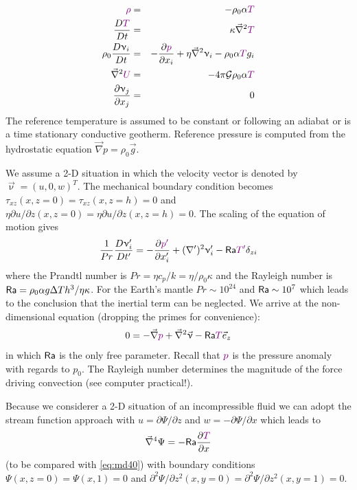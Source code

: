 \begin{eqnarray}
{\color{violet} \rho} &=& -\rho_0 \alpha {\color{violet}T} \\
\frac{D {\color{violet}T}}{Dt} &=& \kappa \vec\nabla^2 {\color{violet}T} \\
\rho_0 \frac{D\upnu_i}{Dt} &=& -\frac{\partial {\color{violet} p}}{\partial x_i}
+ \eta \vec\nabla^2 \upnu_i - \rho_0 \alpha {\color{violet}T} g_i \\
\vec\nabla^2 {\color{violet}U} &=& -4 \pi {\cal G} \rho_0 \alpha {\color{violet}T} \\
\frac{\partial \upnu_j}{\partial x_j} &=& 0
\end{eqnarray}
The reference temperature is assumed to be constant or following an adiabat or is a time
stationary conductive geotherm. Reference pressure is computed from the hydrostatic
equation $\vec\nabla p = \rho_0 \vec{g}$.

We assume a 2-D situation in which the velocity vector is denoted by
$\vec\upnu=(u,0,w)^T$. The mechanical boundary condition becomes
$\tau_{xz}(x,z=0)=\tau_{xz}(x,z=h)=0$ and 
$\eta \partial u/\partial z (x,z=0) = \eta \partial u/\partial z (x,z=h) = 0$.
The scaling of the equation of motion gives
\begin{equation}
\frac{1}{Pr} \frac{D\upnu_i'}{Dt'} = -\frac{\partial {\color{violet} p'}}{\partial x_i'}
+(\nabla')^2 \upnu_i' - {\mathsf{Ra}} {\color{violet}T'} \delta_{zi}
\label{eq:md78}
\end{equation}
where the Prandtl number is $Pr=\eta c_p/k= \eta/\rho_0 \kappa$ and the 
Rayleigh number is ${\mathsf{Ra}}=\rho_0 \alpha g \Delta T h^3 / \eta \kappa$.
For the Earth's mantle $Pr \sim 10^{24}$ and ${\mathsf{Ra}}\sim 10^7$ 
which leads to the conclusion that the inertial
term can be neglected. We arrive at the non-dimensional equation (dropping the primes
for convenience):
\begin{equation}
0 = -\vec\nabla {\color{violet} p} + \vec\nabla^2 \vec\upnu - {\mathsf{Ra}} {\color{violet}T} \vec{e}_z
\label{eq:md79}
\end{equation}
in which ${\mathsf{Ra}}$ is the only free parameter. Recall that ${\color{violet}p}$ 
is the pressure anomaly with regards to $p_0$. 
The Rayleigh number determines the magnitude of the force driving convection (see computer 
practical!).

Because we considerer a 2-D situation of an incompressible fluid we can adopt the stream
function approach with $u=\partial \Psi/\partial z$ and $w=-\partial \Psi/\partial x$ which 
leads to
\begin{equation}
\vec\nabla^4 \Psi = -{\mathsf{Ra}} \frac{\partial {\color{violet}T}}{\partial x}
\label{eq:md80}
\end{equation}
(to be compared with \eqref{eq:md40}) with boundary conditions $\Psi(x,z=0)=\Psi(x,1)=0$
and $\partial^2 \Psi/\partial z^2 (x,y=0)=\partial^2 \Psi/\partial z^2 (x,y=1)=0$.

